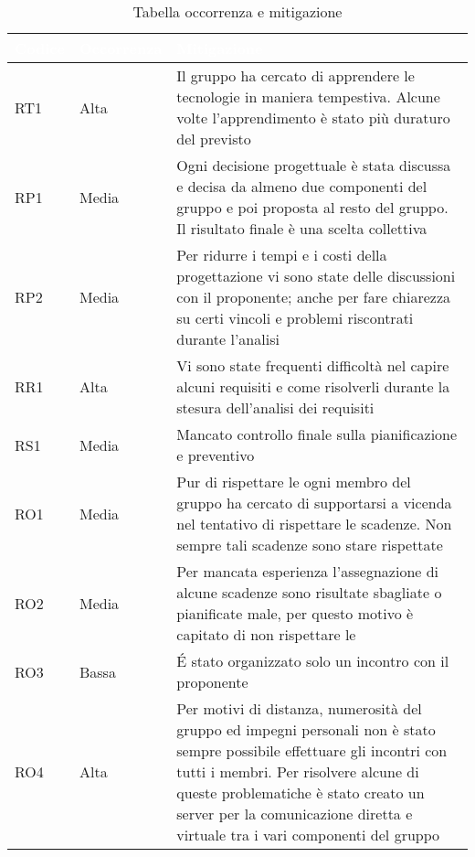 {
\renewcommand{\arraystretch}{2}
\centering
	
\begin{longtable}{C{2cm} C{3cm} C{8cm}}
\caption{Tabella occorrenza e mitigazione}\\
	\textcolor{white}{\textbf{Codice}} & 
	\textcolor{white}{\textbf{Occorrenza}} & 
	\textcolor{white}{\textbf{Mitigazione}}\\	
\endhead
		
	RT1 & Alta & Il gruppo \Gruppo{} ha cercato di apprendere le tecnologie in maniera tempestiva. Alcune volte l'apprendimento è stato più duraturo del previsto \\
			
	RP1 & Media & Ogni decisione progettuale è stata discussa e decisa da almeno due componenti del gruppo e poi proposta al resto del gruppo. Il risultato finale è una scelta collettiva \\

	RP2 & Media & Per ridurre i tempi e i costi della progettazione vi sono state delle discussioni con il proponente; anche per fare chiarezza su certi vincoli e problemi riscontrati durante l'analisi \\

	RR1 & Alta & Vi sono state frequenti difficoltà nel capire alcuni requisiti e come risolverli durante la stesura dell'analisi dei requisiti \\

	RS1 & Media & Mancato controllo finale sulla pianificazione e preventivo \\

	RO1 & Media & Pur di rispettare le  ogni membro del gruppo ha cercato di supportarsi a vicenda nel tentativo di rispettare le scadenze. Non sempre tali scadenze sono stare rispettate \\

	RO2 & Media & Per mancata esperienza l'assegnazione di alcune scadenze sono risultate sbagliate o pianificate male, per questo motivo è capitato di non rispettare le  \\

	RO3 & Bassa & É stato organizzato solo un incontro con il proponente \\

	RO4 & Alta & Per motivi di distanza, numerosità del gruppo ed impegni personali non è stato sempre possibile effettuare gli incontri con tutti i membri. Per risolvere alcune di queste problematiche è stato creato un server  per la comunicazione diretta e virtuale tra i vari componenti del gruppo \\
		
	
	\end{longtable}
	
}